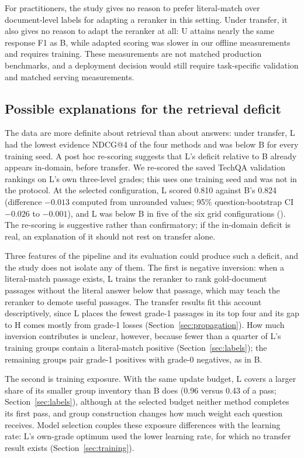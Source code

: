 For practitioners, the study gives no reason to prefer literal-match over document-level labels for adapting a reranker in this setting. Under transfer, it also gives no reason to adapt the reranker at all: U attains nearly the same response F1 as B, while adapted scoring was slower in our offline measurements and requires training. These measurements are not matched production benchmarks, and a deployment decision would still require task-specific validation and matched serving measurements.

\subsection{Possible explanations for the retrieval deficit}
The data are more definite about retrieval than about answers: under transfer, L had the lowest evidence NDCG@4 of the four methods and was below B for every training seed. A post hoc re-scoring suggests that L's deficit relative to B already appears in-domain, before transfer. We re-scored the saved TechQA validation rankings on L's own three-level grades; this uses one training seed and was not in the protocol. At the selected configuration, L scored 0.810 against B's 0.824 (difference $-0.013$ computed from unrounded values; 95\% question-bootstrap CI $-0.026$ to $-0.001$), and L was below B in five of the six grid configurations (). The re-scoring is suggestive rather than confirmatory; if the in-domain deficit is real, an explanation of it should not rest on transfer alone.

Three features of the pipeline and its evaluation could produce such a deficit, and the study does not isolate any of them. The first is negative inversion: when a literal-match passage exists, L trains the reranker to rank gold-document passages without the literal answer below that passage, which may teach the reranker to demote useful passages. The transfer results fit this account descriptively, since L places the fewest grade-1 passages in its top four and its gap to H comes mostly from grade-1 losses (Section~\ref{sec:propagation}). How much inversion contributes is unclear, however, because fewer than a quarter of L's training groups contain a literal-match positive (Section~\ref{sec:labels}); the remaining groups pair grade-1 positives with grade-0 negatives, as in B.

The second is training exposure. With the same update budget, L covers a larger share of its smaller group inventory than B does (0.96 versus 0.43 of a pass; Section~\ref{sec:labels}), although at the selected budget neither method completes its first pass, and group construction changes how much weight each question receives. Model selection couples these exposure differences with the learning rate: L's own-grade optimum used the lower learning rate, for which no transfer result exists (Section~\ref{sec:training}).

